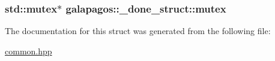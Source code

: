 \subsubsection[{\texorpdfstring{mutex}{mutex}}]{\setlength{\rightskip}{0pt plus 5cm}std\+::mutex$\ast$ galapagos\+::\+\_\+done\+\_\+struct\+::mutex}\hypertarget{structgalapagos_1_1__done__struct_ac4bd65b6a9581344f8943a499dbd5456}{}\label{structgalapagos_1_1__done__struct_ac4bd65b6a9581344f8943a499dbd5456}


The documentation for this struct was generated from the following file\+:\begin{DoxyCompactItemize}
\item 
\hyperlink{common_8hpp}{common.\+hpp}\end{DoxyCompactItemize}
